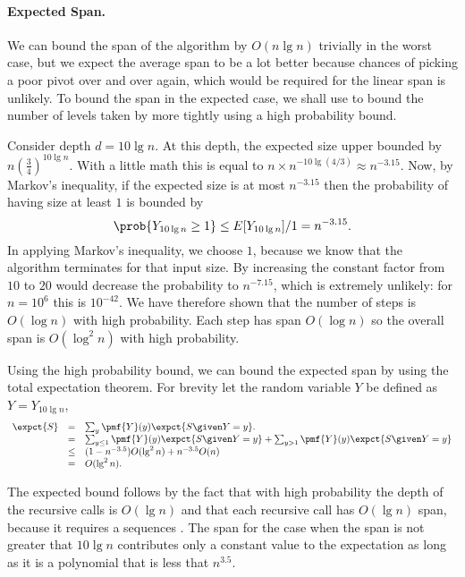 {\paragraph{Expected Span.}
We can bound the span of the algorithm by $O(n\lg{n})$ trivially
in the worst case, but we expect the average span to be a lot better
because chances of picking a poor pivot over and over again, which
would be required for the linear span is unlikely.
%
To bound the span in the expected case, we shall use
 to bound the number of levels taken by
\ksmall{} more tightly using a high probability bound.
%

Consider depth $d = 10 \lg n$.
%
At this depth, the expected size upper bounded by
$n\left(\frac{3}{4}\right)^{10 \lg n}$.
%
With a little math this is equal to $n \times n^{-10 \lg (4/3)}
\approx n^{-3.15}$.
%
Now, by Markov's inequality, if the expected size is at most
$n^{-3.15}$ then the probability of having size at least $1$ is
bounded by
\[ 
\prob{Y_{10\lg n} \geq 1} \leq E[Y_{10\lg n}]/1 = n^{-3.15}. 
\]
In applying Markov's inequality, we choose $1$, because we know that
the algorithm terminates for that input size.
%
By increasing the constant factor from $10$ to $20$ would decrease the
probability to $n^{-7.15}$, which is extremely unlikely: for $n =
10^6$ this is $10^{-42}$.  
%
We have therefore shown that the number of steps is $O(\log n)$ with
high probability.  
%
Each step has span $O(\log n)$ so the overall span is $O(\log^2 n)$
with high probability.

Using the high probability bound, we can bound the expected span by
using the total expectation theorem.
%
For brevity let the random variable $Y$ be defined as $Y = Y_{10\lg n}$,
%
\[
\begin{array}{lll}
\expct{S} & = & \sum_{y}\pmf{Y}(y) \expct{S \given Y = y}.
\\
& = & 
\sum_{y \le 1}{\pmf{Y}(y) \expct{S \given Y = y}}
 + 
\sum_{y >1}{\pmf{Y}(y) \expct{S \given Y = y}}
\\
& \le & 
(1 - n^{-3.5}) O(\lg^2{n}) 
 + 
n^{-3.5} O(n)
\\
& = &
O(\lg^2{n}). 
\end{array}
\]

The expected bound follows by the fact that with high probability the
depth of the recursive calls is $O(\lg{n})$ and that each
recursive call has $O(\lg{n})$ span, because it requires a
sequences .
%
The span for the case when the span is not greater that $10\lg{n}$
contributes only a constant value to the expectation as long as it is
a polynomial that is less that $n^{3.5}$.

}
